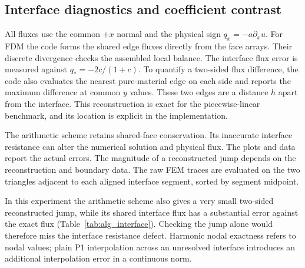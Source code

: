 \begin{table}[H]\centering\small

\caption{Median stage costs from three repetitions. CG excludes Jacobi setup in this table; LU includes factorisation and one triangular solve. The cost--accuracy plot additionally includes assembly and Jacobi setup.}
\label{tab:alg_cost}
\end{table}

\subsection{Interface diagnostics and coefficient contrast}
All fluxes use the common $+x$ normal and the physical sign $q_x=-a\partial_xu$. For FDM the code forms the shared edge fluxes directly from the face arrays. Their discrete divergence checks the assembled local balance. The interface flux error is measured against $q_*=-2c/(1+c)$. To quantify a two-sided flux difference, the code also evaluates the nearest pure-material edge on each side and reports the maximum difference at common $y$ values. These two edges are a distance $h$ apart from the interface. This reconstruction is exact for the piecewise-linear benchmark, and its location is explicit in the implementation.

The arithmetic scheme retains shared-face conservation. Its inaccurate interface resistance can alter the numerical solution and physical flux. The plots and data report the actual errors. The magnitude of a reconstructed jump depends on the reconstruction and boundary data. The raw FEM traces are evaluated on the two triangles adjacent to each aligned interface segment, sorted by segment midpoint.

In this experiment the arithmetic scheme also gives a very small two-sided reconstructed jump, while its shared interface flux has a substantial error against the exact flux (Table~\ref{tab:alg_interface}). Checking the jump alone would therefore miss the interface resistance defect. Harmonic nodal exactness refers to nodal values; plain P1 interpolation across an unresolved interface introduces an additional interpolation error in a continuous norm.

\begin{table}[H]\centering\small

\caption{Layered diagnostics at neighbouring mesh sizes, $c=10$. $E_q$ is the maximum interface flux error; $J_q$ is the explicitly defined two-sided flux difference. Mesh parity follows each method's interface treatment.}
\label{tab:alg_interface}
\end{table}

